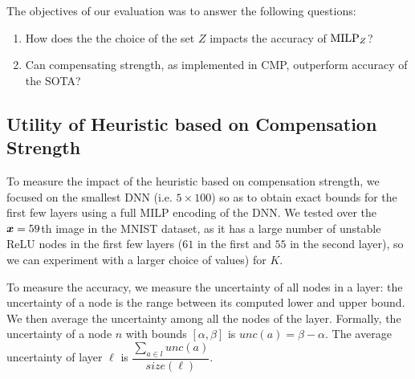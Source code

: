 The  objectives of our evaluation was to answer the following  questions:

\begin{enumerate}
	\item How does the the choice of the set $Z$ impacts the accuracy of ${\textrm{MILP}}_Z$? 
	\item Can compensating strength, as implemented in CMP, outperform accuracy of the SOTA? 
\end{enumerate}

\subsection{Utility of Heuristic based on Compensation Strength  }

To measure the impact of the heuristic based on compensation strength, we focused on the smallest DNN (i.e. $5\times 100$) so as to obtain exact bounds for the first few layers using a full MILP encoding of the DNN. We tested over the ${\bm{x}}=59$th image in the MNIST dataset, as it has a large number of unstable ReLU nodes in the first few layers ($61$ in the first and $55$ in the second layer), so we can experiment with a larger choice of values) for $K$.

To measure the accuracy, we measure the uncertainty of all nodes in a layer:
the uncertainty of a node is the range between its computed lower and upper bound. 
We then average the uncertainty among all the nodes of the layer.
Formally, the uncertainty of a node $n$ with bounds $[\alpha,\beta]$ is $unc(a) = \beta - \alpha$. The average uncertainty of layer $\ell$ is $\dfrac{\sum_{a\in l} unc(a)}{size(\ell)}.$








